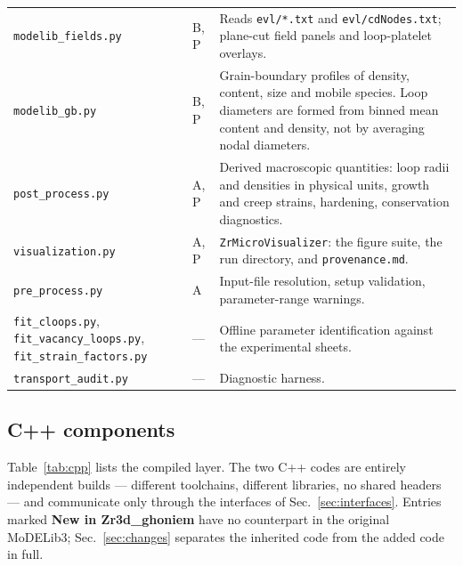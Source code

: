 \documentclass[11pt]{article}
\newcommand{\MoD}{\textsf{MoDELib3}}
\newcommand{\Zrd}{\textsf{Zr3d\_ghoniem}}
\newcommand{\code}[1]{\texttt{\small #1}}
\newcommand{\file}[1]{\texttt{\footnotesize #1}}
\begin{document}
\begin{longtable}{@{}p{}p{}p{}@{}}
\file{modelib\_fields.py} & B, P &
  Reads \file{evl/*.txt} and \file{evl/cdNodes.txt}; plane-cut field panels and
  loop-platelet overlays. \\
\file{modelib\_gb.py} & B, P &
  Grain-boundary profiles of density, content, size and mobile species. Loop
  diameters are formed from binned mean content and density, not by averaging
  nodal diameters. \\
\file{post\_process.py} & A, P &
  Derived macroscopic quantities: loop radii and densities in physical units,
  growth and creep strains, hardening, conservation diagnostics. \\
\file{visualization.py} & A, P &
  \code{ZrMicroVisualizer}: the figure suite, the run directory, and
  \file{provenance.md}. \\
\file{pre\_process.py} & A &
  Input-file resolution, setup validation, parameter-range warnings. \\
\file{fit\_cloops.py}, \file{fit\_vacancy\_loops.py},
\file{fit\_strain\_factors.py} & --- &
  Offline parameter identification against the experimental sheets. \\
\file{transport\_audit.py} & --- & Diagnostic harness. \\
\bottomrule
\end{longtable}

\subsection{C++ components}

Table~\ref{tab:cpp} lists the compiled layer. The two C++ codes are entirely
independent builds --- different toolchains, different libraries, no shared
headers --- and communicate only through the interfaces of
Sec.~\ref{sec:interfaces}. Entries marked \textbf{New in \Zrd{}} have no
counterpart in the original \MoD{}; Sec.~\ref{sec:changes} separates the
inherited code from the added code in full.
\end{document}
